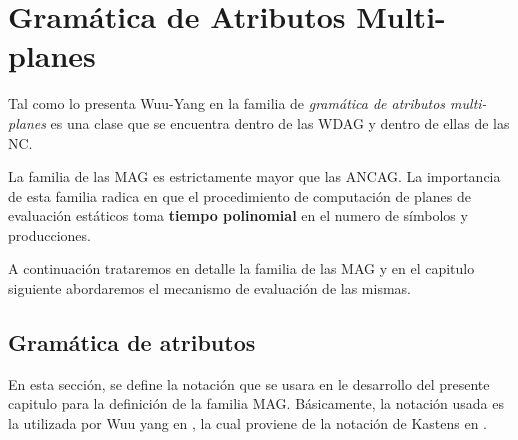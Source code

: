 \chapter{Gramática de Atributos Multi-planes}
\label{chap:mag}
\minitoc

Tal como lo presenta Wuu-Yang en \cite{wuu-yang1} la familia de \textit{gramática de atributos multi-planes} es una clase que se encuentra dentro de las WDAG y dentro de ellas de las NC.

La familia de las MAG es estrictamente mayor que las ANCAG. La importancia de esta familia radica en que el procedimiento de computación de planes de evaluación estáticos toma \textbf{tiempo polinomial} en el numero de símbolos y producciones.

A continuación trataremos en detalle la familia de las MAG y en el capitulo siguiente abordaremos el mecanismo de evaluación de las mismas.

\section{Gramática de atributos}
En esta sección, se define la notación que se usara en le desarrollo del presente capitulo para la definición de la familia MAG.
Básicamente, la notación usada es la utilizada por Wuu yang en \cite{wuu-yang1}, la cual proviene de la notación de Kastens en \cite{kastens}.

